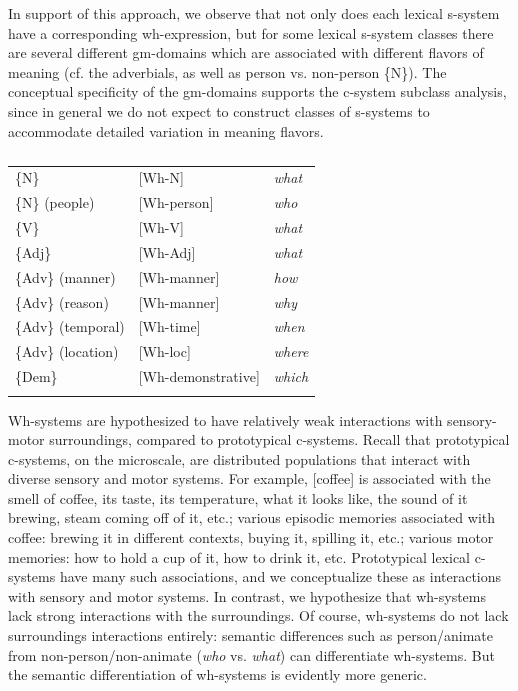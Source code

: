   In support of this approach, we observe that not only does each lexical s-system have a corresponding wh-expression, but for some lexical s-system classes there are several different gm-domains which are associated with different flavors of meaning (cf. the adverbials, as well as person vs. non-person \{N\}). The conceptual specificity of the gm-domains supports the c-system subclass analysis, since in general we do not expect to construct classes of s-systems to accommodate detailed variation in meaning flavors.

\begin{table}
\begin{tabularx}{\textwidth}{XXX}
\lsptoprule
\{N\} & [Wh-N] & \textit{what}\\
\{N\} (people) & [Wh-person] & \textit{who}\\
\{V\} & [Wh-V] & \textit{what}\\
\{Adj\} & [Wh-Adj] & \textit{what}\\
\{Adv\} (manner) & [Wh-manner] & \textit{how}\\
\{Adv\} (reason) & [Wh-manner] & \textit{why}\\
\{Adv\} (temporal) & [Wh-time] & \textit{when}\\
\{Adv\} (location) & [Wh-loc] & \textit{where}\\
\{Dem\} & [Wh-demonstrative] & \textit{which}\\
\lspbottomrule
\end{tabularx}
\caption{\missingcaption}\label{tab:key:}
\end{table}
  Wh-systems are hypothesized to have relatively weak interactions with sensory-motor surroundings, compared to prototypical c-systems. Recall that prototypical c-systems, on the microscale, are distributed populations that interact with diverse sensory and motor systems. For example, [coffee] is associated with the smell of coffee, its taste, its temperature, what it looks like, the sound of it brewing, steam coming off of it, etc.; various episodic memories associated with coffee: brewing it in different contexts, buying it, spilling it, etc.; various motor memories: how to hold a cup of it, how to drink it, etc. Prototypical lexical c-systems have many such associations, and we conceptualize these as interactions with sensory and motor systems. In contrast, we hypothesize that wh-systems lack strong interactions with the surroundings. Of course, wh-systems do not lack surroundings interactions entirely: semantic differences such as person/animate from non-person/non-animate (\textit{who} vs. \textit{what}) can differentiate wh-systems. But the semantic differentiation of wh-systems is evidently more generic.

